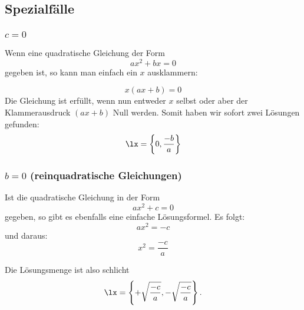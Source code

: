 \subsection{Spezialfälle}


\subsubsection{$c=0$}
Wenn eine quadratische Gleichung der Form
$$ax^2 +bx = 0$$
gegeben ist, so kann man einfach ein $x$ ausklammern:

$$x(ax+b)=0$$
 Die Gleichung ist erfüllt, wenn nun entweder $x$ selbst oder aber
 der Klammerausdruck $(ax+b)$ Null werden. Somit haben wir sofort zwei
 Lösungen gefunden:
 $$\lx=\left\{0, \frac{-b}{a}\right\}$$

 \newpage

 
 \subsubsection{$b=0$ (reinquadratische Gleichungen)}
 Ist die quadratische Gleichung in der Form
 $$ax^2 + c = 0$$
 gegeben, so gibt es ebenfalls eine einfache Lösungsformel. Es folgt:
 $$ax^2 = -c$$
 und daraus:
 $$x^2 = \frac{-c}{a}$$

 Die Lösungsmenge ist also schlicht
 $$\lx=\left\{ + \sqrt{\frac{-c}{a}}, -\sqrt{\frac{-c}{a}} \right\}.$$

\newpage
